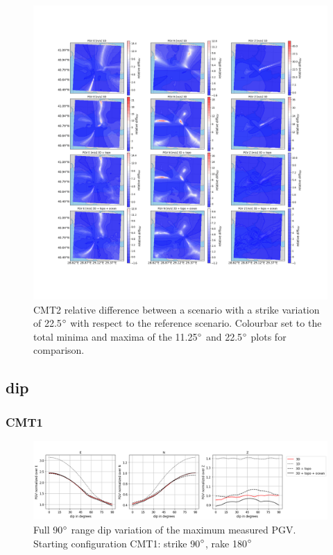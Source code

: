 \documentclass[../Text/00main.tex]{subfiles}
\begin{document}
\begin{figure}[!htp]
    \centering
    \includegraphics[width=1\linewidth,trim = 2cm 5cm 1cm 5cm, clip]{images_results/strike_variation_epsilon25_sc2.png}
    \caption{CMT2 relative difference between a scenario with a strike variation of 22.5$\degree$ with respect to the reference scenario. Colourbar set to the total minima and maxima of the 11.25$\degree$ and 22.5$\degree$ plots for comparison.}
    \label{fig:ref_eps25-2}
\end{figure}

\FloatBarrier

\subsection{dip}

\subsubsection{CMT1}

\begin{figure}[htb!]
    \centering
    \includegraphics[width=.8\textwidth]{images_results/fullrange_dipvar_maxvals_sc1.png}
    \caption{Full 90$\degree$ range dip variation of the maximum measured PGV. Starting configuration CMT1: strike 90$\degree$, rake 180$\degree$}
    \label{fig:fullrange_1_dip}
\end{figure}
\end{document}
